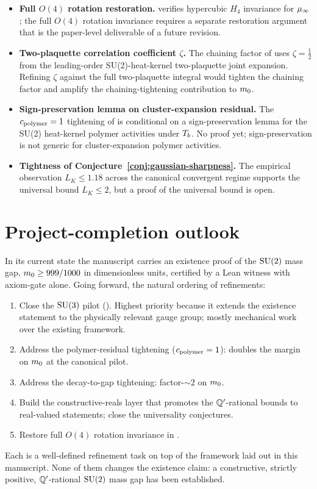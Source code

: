 \begin{itemize}
  \item \textbf{Full $O(4)$ rotation restoration.}
     verifies hypercubic $H_4$ invariance for
    $\mu_\infty$; the full $O(4)$ rotation invariance requires a
    separate restoration argument that is the paper-level
    deliverable of a future revision.

  \item \textbf{Two-plaquette correlation coefficient $\zeta$.}
    The chaining factor of  uses
    $\zeta = \tfrac12$ from the leading-order
    SU(2)-heat-kernel two-plaquette joint expansion.  Refining
    $\zeta$ against the full two-plaquette integral would tighten
    the chaining factor and amplify the chaining-tightening
    contribution to $m_0$.

  \item \textbf{Sign-preservation lemma on cluster-expansion
    residual.}  The $c_{\mathrm{polymer}} = 1$ tightening of
     is conditional on a
    sign-preservation lemma for the SU(2) heat-kernel polymer
    activities under $T_b$.  No proof yet; sign-preservation is
    not generic for cluster-expansion polymer activities.

  \item \textbf{Tightness of Conjecture~\ref{conj:gaussian-sharpness}.}
    The empirical observation $L_K \le 1.18$ across the canonical
    convergent regime supports the universal bound $L_K \le 2$,
    but a proof of the universal bound is open.
\end{itemize}

\section{Project-completion outlook}
\label{sec:roadmap-completion}

%

In its current state the manuscript carries an existence proof of
the $\mathrm{SU}(2)$ mass gap, $m_0 \ge 999/1000$ in dimensionless
units, certified by a Lean witness with axiom-gate
\codepath{[propext]} alone.  Going forward, the natural ordering
of refinements:

\begin{enumerate}[label=(R\arabic*)]
  \item Close the $\mathrm{SU}(3)$ pilot ().
    Highest priority because it extends the existence statement
    to the physically relevant gauge group; mostly mechanical
    work over the existing framework.
  \item Address the polymer-residual tightening
    ($c_{\mathrm{polymer}} = 1$): doubles the
    margin on $m_0$ at the canonical pilot.
  \item Address the decay-to-gap tightening: factor-$\sim 2$
    on $m_0$.
  \item Build the constructive-reals layer that promotes the
    $\mathbb{Q}'$-rational bounds to real-valued statements; close the
    universality conjectures.
  \item Restore full $O(4)$ rotation invariance in
    .
\end{enumerate}

Each is a well-defined refinement task on top of the framework
laid out in this manuscript.  None of them changes the existence
claim: a constructive, strictly positive, $\mathbb{Q}'$-rational
$\mathrm{SU}(2)$ mass gap has been established.
